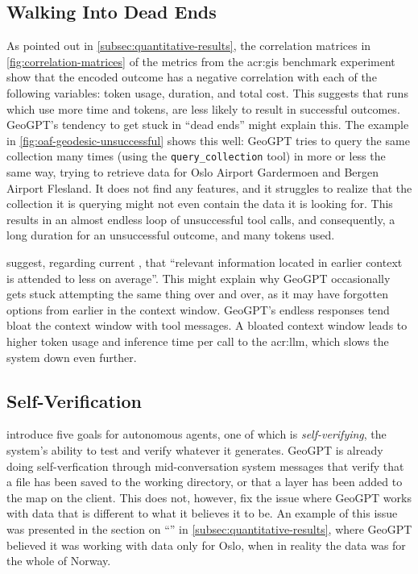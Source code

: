 \subsection[Walking Into Dead Ends]{Walking Into Dead Ends}
\label{subsec:dead-ends}

As pointed out in \autoref{subsec:quantitative-results}, the correlation matrices in \autoref{fig:correlation-matrices} of the metrics from the \acrshort{acr:gis} benchmark experiment show that the encoded outcome has a negative correlation with each of the following variables: token usage, duration, and total cost. This suggests that runs which use more time and tokens, are less likely to result in successful outcomes. GeoGPT's tendency to get stuck in \enquote{dead ends} might explain this. The example in \autoref{fig:oaf-geodesic-unsuccessful} shows this well: GeoGPT tries to query the same collection many times (using the \texttt{query\_collection} tool) in more or less the same way, trying to retrieve data for Oslo Airport Gardermoen and Bergen Airport Flesland. It does not find any features, and it struggles to realize that the collection it is querying might not even contain the data it is looking for. This results in an almost endless loop of unsuccessful tool calls, and consequently, a long duration for an unsuccessful outcome, and many tokens used.

\cite{peysakhovichAttentionSortingCombats2023} suggest, regarding current , that \enquote{relevant information located in earlier context is attended to less on average}. This might explain why GeoGPT occasionally gets stuck attempting the same thing over and over, as it may have forgotten options from earlier in the context window. GeoGPT's endless responses tend bloat the context window with tool messages. A bloated context window leads to higher token usage and inference time per call to the \acrshort{acr:llm}, which slows the system down even further.


\subsection{Self-Verification}
\label{subsec:self-verification}

\cite{liAutonomousGISNextgeneration2023} introduce five goals for autonomous agents, one of which is \textit{self-verifying}, the system's ability to test and verify whatever it generates. GeoGPT is already doing self-verfication through mid-conversation system messages that verify that a file has been saved to the working directory, or that a layer has been added to the map on the client. This does not, however, fix the issue where GeoGPT works with data that is different to what it believes it to be. An example of this issue was presented in the section on \enquote{} in \autoref{subsec:quantitative-results}, where GeoGPT believed it was working with data only for Oslo, when in reality the data was for the whole of Norway.

